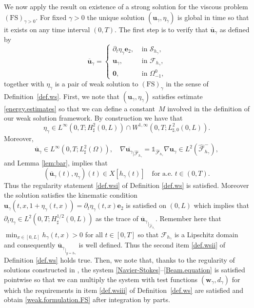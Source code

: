 \documentclass[10pt]{amsart}
\let\mathcal\mathscr
\newcommand{\FS}{\mathrm{FS}}
\theoremstyle{remark}
\theoremstyle{definition}
\newcommand{\ug}{\boldsymbol{u}}
\newcommand{\wg}{\boldsymbol{w}}
\newcommand{\BS}[1]{\boldsymbol{#1}}
\begin{document}
We now apply the result on existence of a strong solution for the viscous problem $(\FS)_{\gamma>0}$. For fixed $\gamma >0$ the unique solution $(\ug_\gamma,\eta_\gamma)$ is global in time so that it exists on any time interval $(0,T)$.
The first step is to verify that $\overline{\ug}_{\gamma}$ as defined by
\[
\overline{\ug}_{\gamma} =
\begin{cases}
\partial_t \eta_{\gamma} \BS{e}_2, & \text{ in $\mathcal S_{h_{\gamma}}$,} \\
\ug_{\gamma}, & \text{ in $\mathcal F_{h_{\gamma}}$,} \\
\BS{0}, & \text{ in $\Omega_{-1}^0$,}
\end{cases}
\]
together with $\eta_{\gamma}$ is a pair of weak solution
to $(\FS)_{\gamma}$ in the sense of Definition~\ref{def.ws}. First, we note that $(\ug_\gamma,\eta_\gamma)$
satisfies estimate \eqref{energy.estimates} so that we can define a constant~$M$ involved in the definition
of our weak solution framework. By construction we have that
\[
\eta_{\gamma} \in L^{\infty}(0,T;H^{2}_{\sharp}(0,L)) \cap W^{1,\infty}(0,T;L^2_{\sharp, 0}(0,L)).
\]
Moreover, \[
\overline{\ug}_{\gamma} \in L^{\infty}(0,T ; L^2_{\sharp}(\Omega)), \quad
\nabla \overline{\ug_{\gamma}}_{|{\widehat{\mathcal F}_{h_{\gamma}}}} = \mathds{1}_{\widehat{\mathcal F}_{h_{\gamma}}}\nabla \ug_{\gamma} \in L^2(\widehat{\mathcal F}^{-}_{h_{\gamma}}),
\]
and
Lemma \ref{lem:bar}, implies that
\[
(\overline{\ug}_{\gamma}(t),\eta_{\gamma})(t) \in X[h_{\gamma}(t)] \quad\text{for a.e. $t \in (0,T)$}.
\]
Thus the regularity statement \eqref{def.wsi} of Definition \ref{def.ws} is satisfied. Moreover the solution satisfies the kinematic condition $\ug_\gamma(t, x, 1+\eta_\gamma(t, x))=\partial_t\eta_\gamma(t,x)\BS{e}_2$ is satisfied on $(0, L)$ which implies that $\partial_t\eta_\gamma\in L^2(0, T ; H^{1/2}_\sharp(0, L))$ as the trace of ${\overline{\ug}_{\gamma}}_{|_{\widehat{\mathcal F}_{h_\gamma}}}$. Remember here that $\min_{x\in [0, L]} h_\gamma(t,x) >0$ for all $t\in [0, T]$ so that $\mathcal{F}_{h_\gamma}$ is a Lipschitz domain and consequently ${\overline{\ug}_{\gamma}}_{\vert_{y=h_\gamma}}$ is well defined. Thus the second item \eqref{def.wsii} of Definition \ref{def.ws} holds true. Then, we note that, thanks to the regularity of solutions constructed
in \hbox{\cite[Th.\,1]{Grandmont-Hillairet}}, the system \eqref{Navier-Stokes}--\eqref{Beam.equation} is satisfied pointwise so that
we can multiply the system with test functions $(\wg_{\gamma},d_{\gamma})$ for which the requirements in item
\eqref{def.wsiii} of Definition~\ref{def.ws} are satisfied and obtain \eqref{weak.formulation.FS} after integration by parts.
\end{document}
